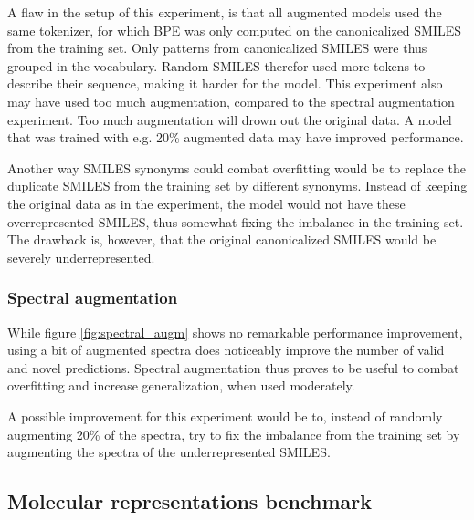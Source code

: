 A flaw in the setup of this experiment, is that all augmented models used the same tokenizer, for which \ac{BPE} was only computed on the canonicalized SMILES from the training set.
Only patterns from canonicalized SMILES were thus grouped in the vocabulary.
Random SMILES therefor used more tokens to describe their sequence, making it harder for the model.
This experiment also may have used too much augmentation, compared to the spectral augmentation experiment.
Too much augmentation will drown out the original data.
A model that was trained with e.g. 20\% augmented data may have improved performance.

Another way SMILES synonyms could combat overfitting would be to replace the duplicate SMILES from the training set by different synonyms.
Instead of keeping the original data as in the experiment, the model would not have these overrepresented SMILES, thus somewhat fixing the imbalance in the training set.
The drawback is, however, that the original canonicalized SMILES would be severely underrepresented.

\subsubsection*{Spectral augmentation}

While figure \ref{fig:spectral_augm} shows no remarkable performance improvement, using a bit of augmented spectra does noticeably improve the number of valid and novel predictions.
Spectral augmentation thus proves to be useful to combat overfitting and increase generalization, when used moderately.

A possible improvement for this experiment would be to, instead of randomly augmenting 20\% of the spectra, try to fix the imbalance from the training set by augmenting the spectra of the underrepresented SMILES.

\subsection{Molecular representations benchmark}


